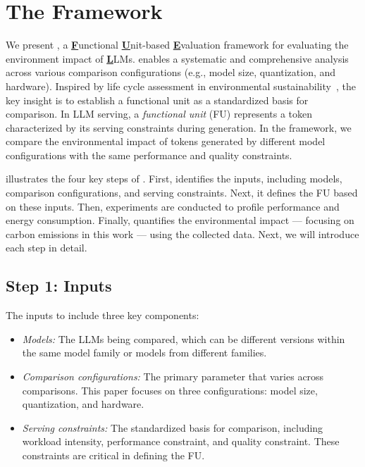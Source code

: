 \section{The Framework \SYSTEM{}} \label{sec:framework}



We present \SYSTEM{}, a \underline{\textbf{F}}unctional \underline{\textbf{U}}nit-based \underline{\textbf{E}}valuation framework for evaluating the environment impact of \underline{\textbf{L}}LMs. \SYSTEM{} enables a systematic and comprehensive analysis across various comparison configurations (e.g., model size, quantization, and hardware). Inspired by life cycle assessment in environmental sustainability~\cite{klopffer2014life}, the key insight is to establish a functional unit as a standardized basis for comparison. In LLM serving, a \emph{functional unit} (FU) represents a token characterized by its serving constraints during generation. In the \SYSTEM{} framework, we compare the environmental impact of tokens generated by different model configurations with the same performance and quality constraints.

 illustrates the four key steps of \SYSTEM{}. First, \SYSTEM{} identifies the inputs, including models, comparison configurations, and serving constraints. Next, it defines the FU based on these inputs. Then, experiments are conducted to profile performance and energy consumption. Finally, \SYSTEM{} quantifies the environmental impact --- focusing on carbon emissions in this work --- using the collected data. Next, we will introduce each step in detail.

\subsection{Step 1: Inputs}

The inputs to \SYSTEM{} include three key components:
\begin{itemize}
    \item \emph{Models:} The LLMs being compared, which can be different versions within the same model family or models from different families.  
    \item \emph{Comparison configurations:} The primary parameter that varies across comparisons. This paper focuses on three configurations: model size, quantization, and hardware.  
    \item \emph{Serving constraints:} The standardized basis for comparison, including workload intensity, performance constraint, and quality constraint. These constraints are critical in defining the FU.
\end{itemize}

